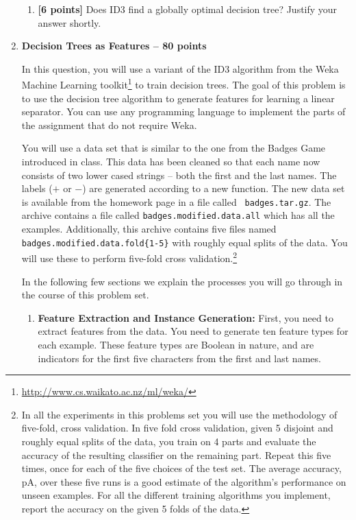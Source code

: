 \begin{enumerate}
\begin{enumerate}
  \item \textbf{[6 points]} Does ID3 find a globally optimal decision tree? Justify your answer shortly.
  \end{enumerate}

\item \textbf{Decision Trees as Features -- 80 points}

In this question, you will use a variant of the ID3 algorithm from the
Weka Machine Learning
toolkit\footnote{\url{http://www.cs.waikato.ac.nz/ml/weka/}} to train
decision trees. The goal of this problem is to use the decision tree
algorithm to generate features for learning a linear separator.  You
can use any programming language to implement the parts of the
assignment that do not require Weka.

You will use a data set that is similar to the one from the Badges
Game introduced in class. This data has been cleaned so that each name now
consists of two lower cased strings -- both the first and the last names.
The labels ($+$ or $-$) are generated according to a new function. 
The new data set is available from the homework page in a file called {\tt
badges.tar.gz}. The archive contains a file called {\tt badges.modified.data.all} which 
has all the examples.  Additionally, this archive contains five files
named {\tt badges.modified.data.fold\{1-5\}} with roughly equal splits
of the data. You will use these to perform five-fold cross validation.\footnote{In all the experiments in this problems set you will use the methodology of five-fold, cross validation. In five fold cross validation, given 5 disjoint and roughly equal splits of the data, you train on 4 parts and evaluate the accuracy of the resulting classifier on the remaining part. Repeat this five times, once for each of the five choices of the test set. The average accuracy, pA, over these five runs is a good estimate of the algorithm’s performance on unseen examples. For all the different training algorithms you implement, report the accuracy on the given 5 folds of the data.}

In the following few sections we explain the processes you will go through in the course
of this problem set.
  
  
  \begin{enumerate}
  \item {\bf Feature Extraction and Instance Generation:} First, you need to extract
features from the data. You need to generate ten feature types for each example.
These feature types are Boolean in nature, and are indicators for the first five
characters from the first and last names.


\end{enumerate}
\end{enumerate}
